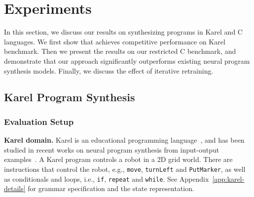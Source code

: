 \section{Experiments}
\vspace{-0.1in}
\label{sec:exp}
In this section, we discuss our results on synthesizing programs in Karel and C languages. We first show that {\ours} achieves competitive performance on Karel benchmark. Then we present the results on our restricted C benchmark, and demonstrate that our approach significantly outperforms existing neural program synthesis models. Finally, we discuss the effect of iterative retraining.

\begin{table}[t]
\caption{\small The comparison between {\ours} and baseline neural program synthesis models in our evaluation.}
\label{tab:approach-comparison}
\end{table}

\vspace{-0.1in}
\subsection{Karel Program Synthesis}
\subsubsection{Evaluation Setup}
\label{sec:exp-setup-karel}

\textbf{Karel domain.} Karel is an educational programming language~\cite{pattis1981karel}, and has been studied in recent works on neural program synthesis from input-output examples~\cite{devlin2017neural,bunel2018leveraging,chen2018execution,shin2018improving}. A Karel program controls a robot in a 2D grid world. There are instructions that control the robot, e.g., \texttt{move}, \texttt{turnLeft} and \texttt{PutMarker}, as well as conditionals and loops, i.e., \texttt{if}, \texttt{repeat} and \texttt{while}. See Appendix~\ref{app:karel-details} for grammar specification and the state representation. 

